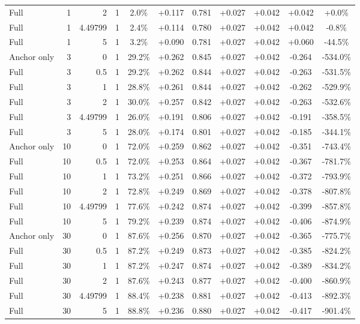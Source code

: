 \begin{table}[htbp]
\begin{tabular}{lrrrccccccc}
Full & 1 & 2 & 1 & 2.0\% & +0.117 & 0.781 & +0.027 & +0.042 & +0.042 & +0.0\% \\
Full & 1 & 4.49799 & 1 & 2.4\% & +0.114 & 0.780 & +0.027 & +0.042 & +0.042 & -0.8\% \\
Full & 1 & 5 & 1 & 3.2\% & +0.090 & 0.781 & +0.027 & +0.042 & +0.060 & -44.5\% \\
Anchor only & 3 & 0 & 1 & 29.2\% & +0.262 & 0.845 & +0.027 & +0.042 & -0.264 & -534.0\% \\
Full & 3 & 0.5 & 1 & 29.2\% & +0.262 & 0.844 & +0.027 & +0.042 & -0.263 & -531.5\% \\
Full & 3 & 1 & 1 & 28.8\% & +0.261 & 0.844 & +0.027 & +0.042 & -0.262 & -529.9\% \\
Full & 3 & 2 & 1 & 30.0\% & +0.257 & 0.842 & +0.027 & +0.042 & -0.263 & -532.6\% \\
Full & 3 & 4.49799 & 1 & 26.0\% & +0.191 & 0.806 & +0.027 & +0.042 & -0.191 & -358.5\% \\
Full & 3 & 5 & 1 & 28.0\% & +0.174 & 0.801 & +0.027 & +0.042 & -0.185 & -344.1\% \\
Anchor only & 10 & 0 & 1 & 72.0\% & +0.259 & 0.862 & +0.027 & +0.042 & -0.351 & -743.4\% \\
Full & 10 & 0.5 & 1 & 72.0\% & +0.253 & 0.864 & +0.027 & +0.042 & -0.367 & -781.7\% \\
Full & 10 & 1 & 1 & 73.2\% & +0.251 & 0.866 & +0.027 & +0.042 & -0.372 & -793.9\% \\
Full & 10 & 2 & 1 & 72.8\% & +0.249 & 0.869 & +0.027 & +0.042 & -0.378 & -807.8\% \\
Full & 10 & 4.49799 & 1 & 77.6\% & +0.242 & 0.874 & +0.027 & +0.042 & -0.399 & -857.8\% \\
Full & 10 & 5 & 1 & 79.2\% & +0.239 & 0.874 & +0.027 & +0.042 & -0.406 & -874.9\% \\
Anchor only & 30 & 0 & 1 & 87.6\% & +0.256 & 0.870 & +0.027 & +0.042 & -0.365 & -775.7\% \\
Full & 30 & 0.5 & 1 & 87.2\% & +0.249 & 0.873 & +0.027 & +0.042 & -0.385 & -824.2\% \\
Full & 30 & 1 & 1 & 87.2\% & +0.247 & 0.874 & +0.027 & +0.042 & -0.389 & -834.2\% \\
Full & 30 & 2 & 1 & 87.6\% & +0.243 & 0.877 & +0.027 & +0.042 & -0.400 & -860.9\% \\
Full & 30 & 4.49799 & 1 & 88.4\% & +0.238 & 0.881 & +0.027 & +0.042 & -0.413 & -892.3\% \\
Full & 30 & 5 & 1 & 88.8\% & +0.236 & 0.880 & +0.027 & +0.042 & -0.417 & -901.4\% \\

\end{tabular}
\end{table}
